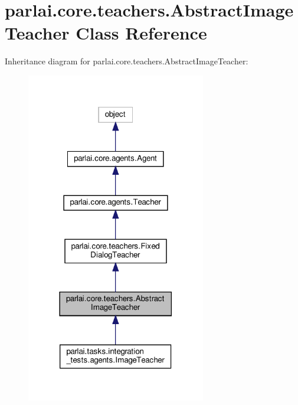 \hypertarget{classparlai_1_1core_1_1teachers_1_1AbstractImageTeacher}{}\section{parlai.\+core.\+teachers.\+Abstract\+Image\+Teacher Class Reference}
\label{classparlai_1_1core_1_1teachers_1_1AbstractImageTeacher}


Inheritance diagram for parlai.\+core.\+teachers.\+Abstract\+Image\+Teacher\+:
\nopagebreak
\begin{figure}[H]
\begin{center}
\leavevmode
\includegraphics[width=222pt]{classparlai_1_1core_1_1teachers_1_1AbstractImageTeacher__inherit__graph}
\end{center}
\end{figure}


